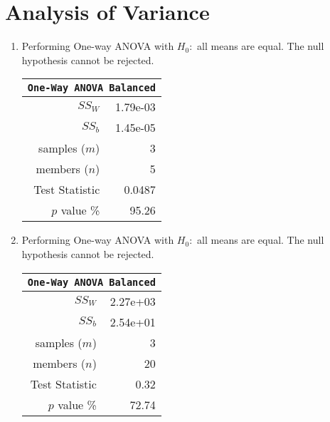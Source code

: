 \chapter{Analysis of Variance}

\begin{enumerate}
	
	\item Performing One-way ANOVA with $ H_0 : $ all means are equal. The null hypothesis cannot be rejected.
	
	\begin{table}[H]
		\centering
		\begin{tabular}{@{}rr@{}}
			\toprule
			\multicolumn{2}{c}{\texttt{One-Way ANOVA Balanced}} \\
			\midrule
			$SS_W$         &               1.79e-03 \\
			$SS_b$         &               1.45e-05 \\
			samples ($m$)  &                      3 \\
			members ($n$)  &                      5 \\
			Test Statistic &                 0.0487 \\
			$p$ value \%   &                  95.26 \\
			\bottomrule
		\end{tabular}
		\bigskip
	\end{table}

	\item Performing One-way ANOVA with $ H_0 : $ all means are equal. The null hypothesis cannot be rejected.

	\begin{table}[H]
		\centering
		\begin{tabular}{@{}rr@{}}
			\toprule
			\multicolumn{2}{c}{\texttt{One-Way ANOVA Balanced}} \\
			\midrule
			$SS_W$         &               2.27e+03 \\
			$SS_b$         &               2.54e+01 \\
			samples ($m$)  &                      3 \\
			members ($n$)  &                     20 \\
			Test Statistic &                   0.32 \\
			$p$ value \%   &                  72.74 \\
			\bottomrule
		\end{tabular}
		\bigskip
	\end{table}


\end{enumerate}
